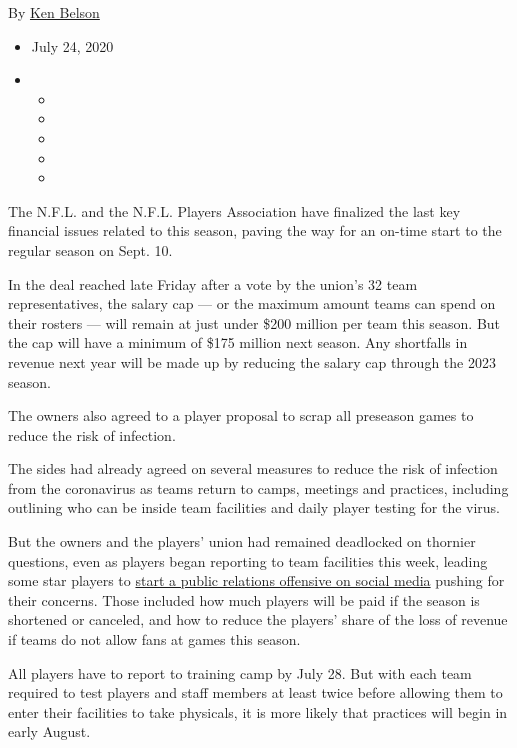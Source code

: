 By \href{https://www.nytimes3xbfgragh.onion/by/ken-belson}{Ken Belson}

\begin{itemize}
\item
  July 24, 2020
\item
  \begin{itemize}
  \item
  \item
  \item
  \item
  \item
  \end{itemize}
\end{itemize}

The N.F.L. and the N.F.L. Players Association have finalized the last
key financial issues related to this season, paving the way for an
on-time start to the regular season on Sept. 10.

In the deal reached late Friday after a vote by the union's 32 team
representatives, the salary cap --- or the maximum amount teams can
spend on their rosters --- will remain at just under \$200 million per
team this season. But the cap will have a minimum of \$175 million next
season. Any shortfalls in revenue next year will be made up by reducing
the salary cap through the 2023 season.

The owners also agreed to a player proposal to scrap all preseason games
to reduce the risk of infection.

The sides had already agreed on several measures to reduce the risk of
infection from the coronavirus as teams return to camps, meetings and
practices, including outlining who can be inside team facilities and
daily player testing for the virus.

But the owners and the players' union had remained deadlocked on
thornier questions, even as players began reporting to team facilities
this week, leading some star players to
\href{https://www.nytimes3xbfgragh.onion/2020/07/20/sports/football/nfl-training-camp-players.html}{start
a public relations offensive on social media} pushing for their
concerns. Those included how much players will be paid if the season is
shortened or canceled, and how to reduce the players' share of the loss
of revenue if teams do not allow fans at games this season.

All players have to report to training camp by July 28. But with each
team required to test players and staff members at least twice before
allowing them to enter their facilities to take physicals, it is more
likely that practices will begin in early August.


